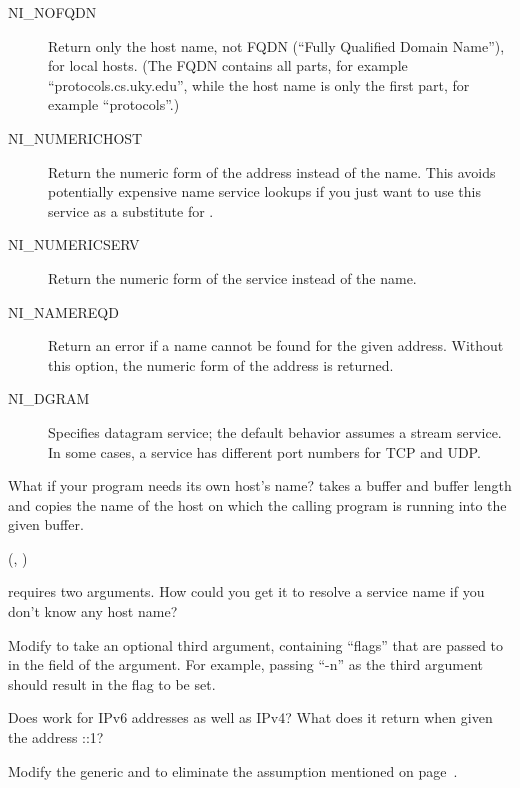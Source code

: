 \begin{description}
\item[NI\_NOFQDN]
Return only the host name, not FQDN (``Fully Qualified Domain Name''), for
local hosts.  (The FQDN contains all parts, for example
``protocols.cs.uky.edu'', while the host name is only the first
part, for example ``protocols''.)
\item[NI\_NUMERICHOST]
Return the numeric form of the address instead of the name.  This
avoids potentially expensive name service lookups if you just want to use
this service as a substitute for .
\item[NI\_NUMERICSERV]
Return the numeric form of the service instead of the name.
\item[NI\_NAMEREQD]
Return an error if a name cannot be found for the given address.
Without this option, the numeric form of the address is returned.
\item[NI\_DGRAM]
Specifies datagram service; the default behavior assumes a stream
service. In some cases, a service has different
port numbers for TCP and UDP.
\end{description}

What if your program needs its own host's name?
 takes a buffer and buffer length
and copies the name of the host on which the calling program is running into
the given buffer.

\begin{inlinefcn}
 (, 
 )
\end{inlinefcn}

\begin{exercises}
\item
{} requires two arguments.  How could you get it to
resolve a service name if you don't know any host name?
\item
Modify  to take an optional third argument,
containing ``flags'' that are passed to  in the
 field of the  argument.
For example, passing ``-n'' as the third argument should result in the
 flag to be set.
\item
Does  work for IPv6 addresses as well as IPv4?
What does it return when given the address ::1?
\item
Modify the generic  and  to
eliminate the assumption mentioned on page~\pageref{page:AFPFassumpt}.
\end{exercises}

